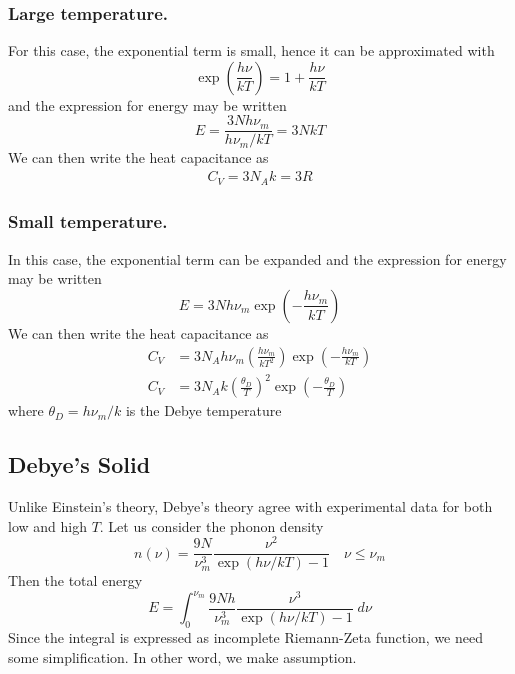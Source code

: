 \documentclass[../../../Main.tex]{subfiles}
\begin{document}
\subsubsection{Large temperature.} For this case, the exponential term is small, hence it can be approximated with
\begin{equation*}
    \exp\left(\frac{h\nu}{kT}\right)=1+\frac{h\nu}{kT}
\end{equation*}
and the expression for energy may be written
\begin{equation*}
    E=\frac{3Nh\nu_m}{h\nu_m/kT}=3NkT
\end{equation*}
We can then write the heat capacitance as 
\begin{align*}
    C_V=3N_Ak=3R
\end{align*}

\subsubsection{Small temperature.} In this case, the exponential term can be expanded and the expression for energy may be written
\begin{equation*}
    E=3Nh\nu_m\exp\left(-\frac{h\nu_m}{kT}\right)
\end{equation*}
We can then write the heat capacitance as 
\begin{align*}
    C_V&=3N_Ah\nu_m\left(\frac{h\nu_m}{kT^2}\right)\exp\left(-\frac{h\nu_m}{kT}\right)\\
    C_V&=3N_Ak \left(\frac{\theta_D}{T}\right)^2\exp\left(-\frac{\theta_D}{T}\right)
\end{align*}
where $\theta_D=h\nu_m/k$ is the Debye temperature

\subsection{Debye's Solid}
Unlike Einstein's theory, Debye's theory agree with experimental data for both low and high $T$. Let us consider the phonon density
\begin{equation*}
    n(\nu)=\frac{9N}{\nu_m^3}\frac{\nu^2}{\exp(h\nu/kT)-1}\quad\nu\leq\nu_m
\end{equation*} 
Then the total energy
\begin{equation*}
    E=\int_{0}^{\nu_m}\frac{9Nh}{\nu_m^3}\frac{\nu^3}{\exp(h\nu/kT)-1}\;d\nu
\end{equation*}
Since the integral is expressed as incomplete Riemann-Zeta function, we need some simplification. In other word, we make assumption.
\end{document}
